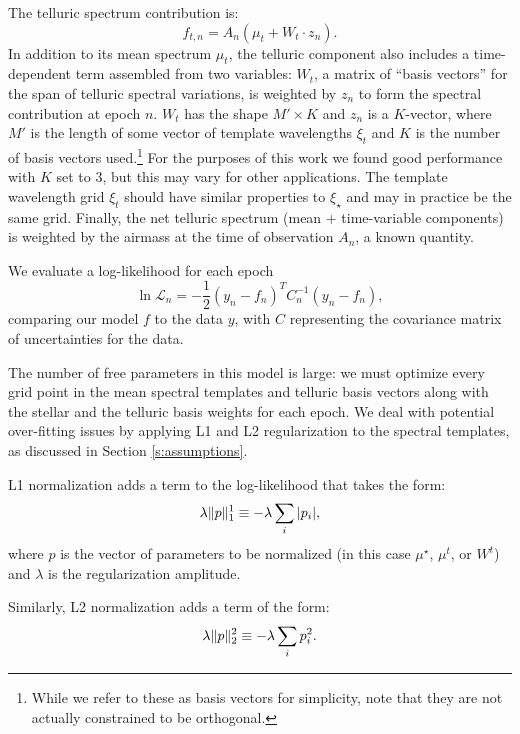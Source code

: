 \documentclass[twocolumn]{aastex62}
\begin{document}
The telluric spectrum contribution is:
\begin{equation}
f_{t,n} =  A_n(\mu_{t} + W_{t} \cdot z_n).
\end{equation}
In addition to its mean spectrum $\mu_t$, the telluric component also includes a time-dependent term assembled from two variables: $W_t$, a matrix of ``basis vectors'' for the span of telluric spectral variations, is weighted by $z_n$ to form the spectral contribution at epoch $n$. 
$W_t$ has the shape $M' \times K$ and $z_n$ is a $K$-vector, where $M'$ is the length of some vector of template wavelengths $\xi_{t}$ and $K$ is the number of basis vectors used.\footnote{While we refer to these as basis vectors for simplicity, note that they are not actually constrained to be orthogonal.} 
For the purposes of this work we found good performance with $K$ set to 3, but this may vary for other applications. 
The template wavelength grid $\xi_{t}$ should have similar properties to $\xi_{\star}$ and may in practice be the same grid. 
Finally, the net telluric spectrum (mean + time-variable components) is weighted by the airmass at the time of observation $A_n$, a known quantity.

We evaluate a log-likelihood for each epoch
\begin{equation}
\ln \mathcal{L}_n = -\frac{1}{2} (y_{n} - f_{n})^T C_{n}^{-1} (y_{n}-f_{n}),
\label{eqn:lnlike}
\end{equation}
comparing our model $f$ to the data $y$, with $C$ representing the covariance matrix of uncertainties for the data. 

The number of free parameters in this model is large: we must optimize every grid point in the mean spectral templates and telluric basis vectors along with the stellar \RV and the telluric basis weights for each epoch. 
We deal with potential over-fitting issues by applying L1 and L2 regularization to the spectral templates, as discussed in Section \ref{s:assumptions}. 

L1 normalization adds a term to the log-likelihood that takes the form:
\begin{equation}
\Lone{\lambda}{p} \equiv -\lambda \sum_{i} | p_{i} | ,
\end{equation}
where $p$ is the vector of parameters to be normalized (in this case $\mu^{\star}$, $\mu^{t}$, or $W^{t}$) and $\lambda$ is the regularization amplitude.

Similarly, L2 normalization adds a term of the form:
\begin{equation}
\Ltwo{\lambda}{p} \equiv -\lambda \sum_{i} p_{i}^2 .
\end{equation}
\end{document}
